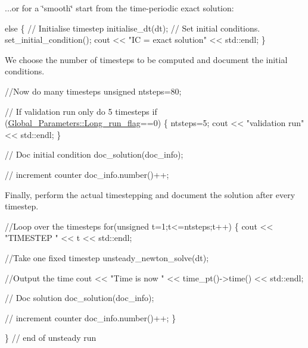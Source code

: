 ...or for a \char`\"{}smooth\char`\"{} start from the time-\/periodic exact solution\+:


\begin{DoxyCodeInclude}
 \textcolor{keywordflow}{else}
  \{
   \textcolor{comment}{// Initialise timestep}
   initialise\_dt(dt);
   \textcolor{comment}{// Set initial conditions.}
   set\_initial\_condition();
   cout << \textcolor{stringliteral}{"IC = exact solution"} << std::endl;
  \} 

\end{DoxyCodeInclude}


We choose the number of timesteps to be computed and document the initial conditions.


\begin{DoxyCodeInclude}

 \textcolor{comment}{//Now do many timesteps}
 \textcolor{keywordtype}{unsigned} ntsteps=80;

 \textcolor{comment}{// If validation run only do 5 timesteps}
 \textcolor{keywordflow}{if} (\hyperlink{namespaceGlobal__Parameters_a457472b8222bb6bb0d97b2aed78d1ef4}{Global\_Parameters::Long\_run\_flag}==0)
  \{ 
   ntsteps=5; 
   cout << \textcolor{stringliteral}{"validation run"} << std::endl;
  \}

 \textcolor{comment}{// Doc initial condition}
 doc\_solution(doc\_info);
 
 \textcolor{comment}{// increment counter}
 doc\_info.number()++;

\end{DoxyCodeInclude}


Finally, perform the actual timestepping and document the solution after every timestep.


\begin{DoxyCodeInclude}

 \textcolor{comment}{//Loop over the timesteps}
 \textcolor{keywordflow}{for}(\textcolor{keywordtype}{unsigned} t=1;t<=ntsteps;t++)
  \{
   cout << \textcolor{stringliteral}{"TIMESTEP "} << t << std::endl;
   
   \textcolor{comment}{//Take one fixed timestep}
   unsteady\_newton\_solve(dt);

   \textcolor{comment}{//Output the time}
   cout << \textcolor{stringliteral}{"Time is now "} << time\_pt()->time() << std::endl;

   \textcolor{comment}{// Doc solution}
   doc\_solution(doc\_info);

   \textcolor{comment}{// increment counter}
   doc\_info.number()++;
  \}

\} \textcolor{comment}{// end of unsteady run}

\end{DoxyCodeInclude}




